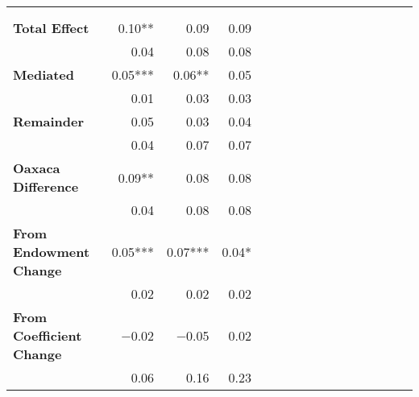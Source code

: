 \begin{tabular}{@{\extracolsep{5pt}}lrrrrrrrrrrrrrrr}
\toprule
&  &  &  \\
{\bf } &  &  &  \\
\hline
{\bf Total Effect} & 0.10**\phantom{*} & 0.09\phantom{***} & 0.09\phantom{***} \\
{\bf  } & 0.04\phantom{***} & 0.08\phantom{***} & 0.08\phantom{***} \\
{\bf Mediated} & 0.05*** & 0.06**\phantom{*} & 0.05\phantom{***} \\
{\bf  } & 0.01\phantom{***} & 0.03\phantom{***} & 0.03\phantom{***} \\
{\bf Remainder} & 0.05\phantom{***} & 0.03\phantom{***} & 0.04\phantom{***} \\
{\bf  } & 0.04\phantom{***} & 0.07\phantom{***} & 0.07\phantom{***} \\
{\bf Oaxaca Difference} & 0.09**\phantom{*} & 0.08\phantom{***} & 0.08\phantom{***} \\
{\bf  } & 0.04\phantom{***} & 0.08\phantom{***} & 0.08\phantom{***} \\
{\bf From Endowment Change} & 0.05*** & 0.07*** & 0.04*\phantom{**} \\
{\bf  } & 0.02\phantom{***} & 0.02\phantom{***} & 0.02\phantom{***} \\
{\bf From Coefficient Change} & $-$0.02\phantom{***} & $-$0.05\phantom{***} & 0.02\phantom{***} \\
{\bf  } & 0.06\phantom{***} & 0.16\phantom{***} & 0.23\phantom{***} \\
\hline
\end{tabular}

